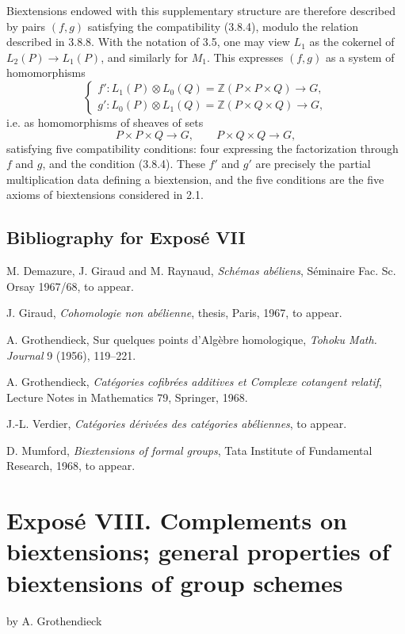 \documentclass[11pt]{article}
\providecommand{\Z}{\mathbb Z}
\begin{document}
Biextensions endowed with this supplementary structure are therefore described by pairs \((f,g)\) satisfying the compatibility (3.8.4), modulo the relation described in 3.8.8.  With the notation of 3.5, one may view \(L_1\) as the cokernel of \(L_2(P)\to L_1(P)\), and similarly for \(M_1\).  This expresses \((f,g)\) as a system of homomorphisms
\[
\begin{cases}
 f':L_1(P)\otimes L_0(Q)=\Z(P\times P\times Q)\longrightarrow G,\\
 g':L_0(P)\otimes L_1(Q)=\Z(P\times Q\times Q)\longrightarrow G,
\end{cases}
\]
i.e. as homomorphisms of sheaves of sets
\[
        P\times P\times Q\longrightarrow G,
        \qquad
        P\times Q\times Q\longrightarrow G,
\]
satisfying five compatibility conditions: four expressing the factorization through \(f\) and \(g\), and the condition (3.8.4).  These \(f'\) and \(g'\) are precisely the partial multiplication data defining a biextension, and the five conditions are the five axioms of biextensions considered in 2.1.

\subsection*{Bibliography for Exposé VII}
\begin{enumerate}[label={[\arabic*]}]
\item M. Demazure, J. Giraud and M. Raynaud, \emph{Schémas abéliens}, Séminaire Fac. Sc. Orsay 1967/68, to appear.
\item J. Giraud, \emph{Cohomologie non abélienne}, thesis, Paris, 1967, to appear.
\item A. Grothendieck, Sur quelques points d'Algèbre homologique, \emph{Tohoku Math. Journal} 9 (1956), 119--221.
\item A. Grothendieck, \emph{Catégories cofibrées additives et Complexe cotangent relatif}, Lecture Notes in Mathematics 79, Springer, 1968.
\item J.-L. Verdier, \emph{Catégories dérivées des catégories abéliennes}, to appear.
\item D. Mumford, \emph{Biextensions of formal groups}, Tata Institute of Fundamental Research, 1968, to appear.
\end{enumerate}

\newpage
\section*{Exposé VIII. Complements on biextensions; general properties of biextensions of group schemes}
\begin{center}
by A. Grothendieck
\end{center}
\end{document}
